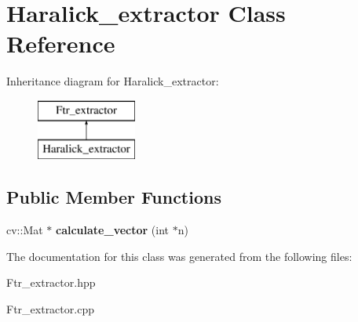 \hypertarget{class_haralick__extractor}{\section{Haralick\+\_\+extractor Class Reference}
\label{class_haralick__extractor}
}
Inheritance diagram for Haralick\+\_\+extractor\+:\begin{figure}[H]
\begin{center}
\leavevmode
\includegraphics[height=2.000000cm]{class_haralick__extractor}
\end{center}
\end{figure}
\subsection*{Public Member Functions}
\begin{DoxyCompactItemize}
\item 
\hypertarget{class_haralick__extractor_a5174b500470909bdd7fcf8126b860b1e}{cv\+::\+Mat $\ast$ {\bfseries calculate\+\_\+vector} (int $\ast$n)}\label{class_haralick__extractor_a5174b500470909bdd7fcf8126b860b1e}

\end{DoxyCompactItemize}


The documentation for this class was generated from the following files\+:\begin{DoxyCompactItemize}
\item 
Ftr\+\_\+extractor.\+hpp\item 
Ftr\+\_\+extractor.\+cpp\end{DoxyCompactItemize}
